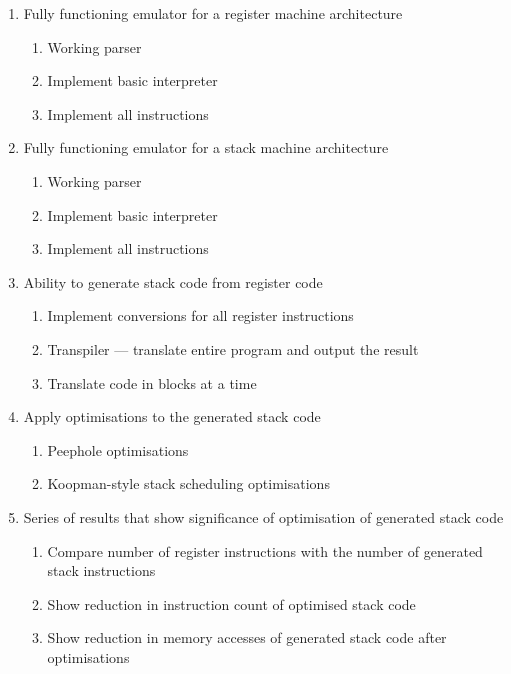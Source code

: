\begin{enumerate}[noitemsep,label=R\arabic*]
  \item Fully functioning emulator for a register machine
    architecture\label{itm:register}
  \begin{enumerate}[noitemsep,label=\theenumi.\arabic*]
    \item Working parser
    \item Implement basic interpreter
    \item Implement all instructions
  \end{enumerate}
  \item Fully functioning emulator for a stack machine
    architecture\label{itm:stack}
  \begin{enumerate}[noitemsep,label=\theenumi.\arabic*]
    \item Working parser
    \item Implement basic interpreter
    \item Implement all instructions
  \end{enumerate}
  \item Ability to generate stack code from register code\label{itm:generate}
  \begin{enumerate}[noitemsep,label=\theenumi.\arabic*]
    \item Implement conversions for all register instructions
    \item Transpiler --- translate entire program and output the result
    \item Translate code in blocks at a time
  \end{enumerate}
  \item Apply optimisations to the generated stack code\label{itm:optimise}
  \begin{enumerate}[noitemsep,label=\theenumi.\arabic*]
    \item Peephole optimisations
    \item Koopman-style stack scheduling optimisations
  \end{enumerate}
  \item Series of results that show significance of optimisation of generated
    stack code\label{itm:results}
  \begin{enumerate}[noitemsep,label=\theenumi.\arabic*]
    \item Compare number of register instructions with the number of generated
      stack instructions
    \item Show reduction in instruction count of optimised stack code
    \item Show reduction in memory accesses of generated stack code after
      optimisations
  \end{enumerate}
\end{enumerate}


